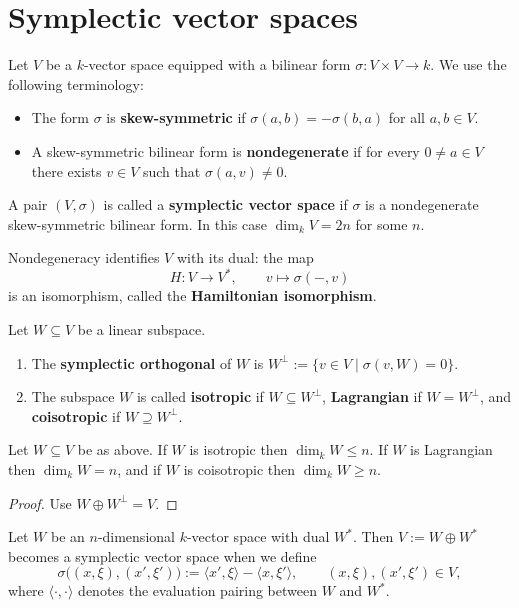 \section{Symplectic vector spaces}

Let $V$ be a $k$-vector space equipped with a bilinear form
$\sigma\colon V\times V\to k$.  We use the following terminology:
\begin{itemize}
    \item The form $\sigma$ is \textbf{skew-symmetric} if
          $\sigma(a,b)=-\sigma(b,a)$ for all $a,b\in V$.
    \item A skew-symmetric bilinear form is \textbf{nondegenerate} if for every
          $0\ne a\in V$ there exists $v\in V$ such that $\sigma(a,v)\ne 0$.
\end{itemize}
A pair $(V,\sigma)$ is called a \textbf{symplectic vector space} if $\sigma$
is a nondegenerate skew-symmetric bilinear form.  In this case
$\dim_k V=2n$ for some $n$.

Nondegeneracy identifies $V$ with its dual: the map
\[
    H \colon V \longrightarrow V^\ast,\qquad
    v \longmapsto \sigma(-,v)
\]
is an isomorphism, called the \textbf{Hamiltonian isomorphism}.

\begin{definition}
    Let $W\subseteq V$ be a linear subspace.
    \begin{enumerate}
        \item The \textbf{symplectic orthogonal} of $W$ is
              $W^\perp:=\{v\in V\mid \sigma(v,W)=0\}$.
        \item The subspace $W$ is called \textbf{isotropic} if $W\subseteq W^\perp$,
              \textbf{Lagrangian} if $W=W^\perp$, and \textbf{coisotropic} if
              $W\supseteq W^\perp$.
    \end{enumerate}
\end{definition}

\begin{lemma}
    Let $W\subseteq V$ be as above.  If $W$ is isotropic then $\dim_k W\le n$.
    If $W$ is Lagrangian then $\dim_k W=n$, and if $W$ is coisotropic then
    $\dim_k W\ge n$.
\end{lemma}
\begin{proof}
    Use $W\oplus W^\perp = V$.
\end{proof}

\begin{example}\label{ex:symplectic-standard}
    Let $W$ be an $n$-dimensional $k$-vector space with dual $W^\ast$.  Then
    $V:=W\oplus W^\ast$ becomes a symplectic vector space when we define
    \[
        \sigma\big((x,\xi),(x',\xi')\big)
        :=\langle x',\xi\rangle-\langle x,\xi'\rangle,
        \qquad (x,\xi),(x',\xi')\in V,
    \]
    where $\langle\cdot,\cdot\rangle$ denotes the evaluation pairing between
    $W$ and $W^\ast$.
\end{example}

